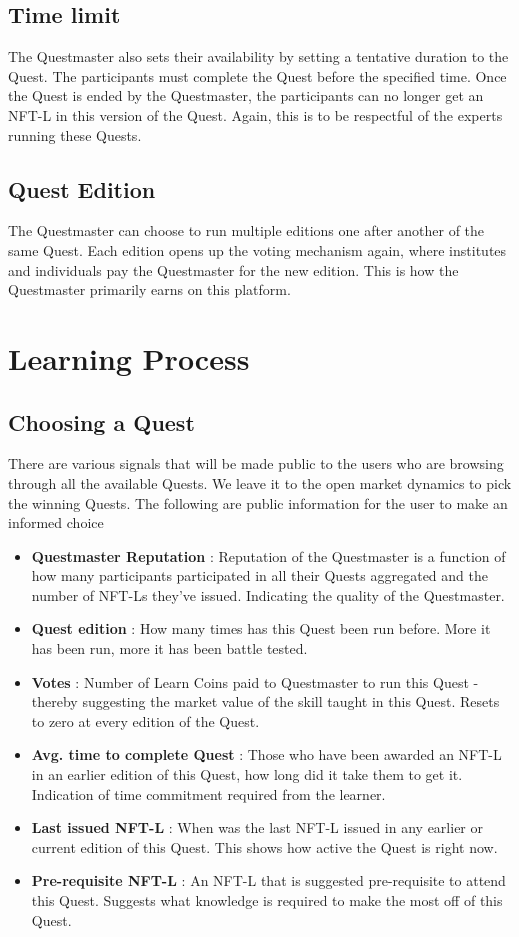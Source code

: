 \documentclass{article}
\begin{document}
    \subsection{Time limit}
      The Questmaster also sets their availability by setting a tentative duration to the Quest. The participants must complete the Quest before the specified time. Once the Quest is ended by the Questmaster, the participants can no longer get an NFT-L in this version of the Quest.
      Again, this is to be respectful of the experts running these Quests. 
    \subsection{Quest Edition}
      The Questmaster can choose to run multiple editions one after another of the same Quest. Each edition opens up the voting mechanism again, where institutes and individuals pay the Questmaster for the new edition. This is how the Questmaster primarily earns on this platform.
  \section{Learning Process}
    \subsection{Choosing a Quest}
        There are various signals that will be made public to the users who are browsing through all the available Quests. We leave it to the open market dynamics to pick the winning Quests.
        The following are public information for the user to make an informed choice
        \begin{itemize}
          \item \textbf{Questmaster Reputation }: Reputation of the Questmaster is a function of how many participants participated in all their Quests aggregated and the number of NFT-Ls they've issued. Indicating the quality of the Questmaster.
          \item \textbf{Quest edition }: How many times has this Quest been run before. More it has been run, more it has been battle tested.
          \item \textbf{Votes }: Number of Learn Coins paid to Questmaster to run this Quest - thereby suggesting the market value of the skill taught in this Quest. Resets to zero at every edition of the Quest.
          \item \textbf{Avg. time to complete Quest }: Those who have been awarded an NFT-L in an earlier edition of this Quest, how long did it take them to get it. Indication of time commitment required from the learner. 
          \item \textbf{Last issued NFT-L }:  When was the last NFT-L issued in any earlier or current edition of this Quest. This shows how active the Quest is right now. 
          \item \textbf{Pre-requisite NFT-L }: An NFT-L that is suggested pre-requisite to attend this Quest. Suggests what knowledge is required to make the most off of this Quest.
        \end{itemize}
\end{document}
